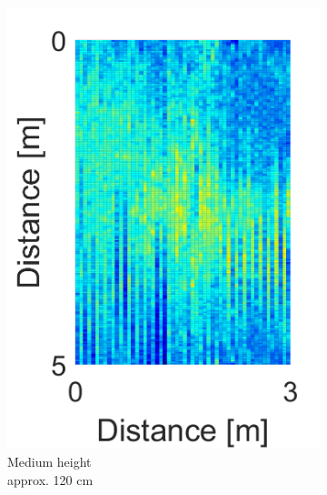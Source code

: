 \begin{figure}[H]
\begin{subfigure}[b]{0.29\textwidth}
\includegraphics[width=\textwidth]{figures/Not_Norm_space_2.png}
\caption{Medium height \\ approx. 120 cm}
\label{Not_norm_medium}
\end{subfigure}
\begin{subfigure}[b]{0.29\textwidth}

\end{subfigure}
\end{figure}
